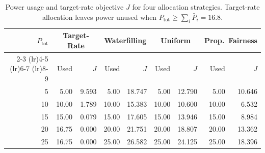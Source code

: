\begin{table}[t]
\centering
\caption{Power usage and target-rate objective $J$ for four allocation strategies. Target-rate allocation leaves power unused when $P_{\mathrm{tot}} \ge \sum_i \bar{P}_i = 16.8$.}
\label{tab:power_usage}
\begin{tabular}{rrrrrrrrr}
\toprule
$P_{\mathrm{tot}}$ & \multicolumn{2}{c}{Target-Rate} & \multicolumn{2}{c}{Waterfilling} & \multicolumn{2}{c}{Uniform} & \multicolumn{2}{c}{Prop.\ Fairness} \\
\cmidrule(lr){2-3} \cmidrule(lr){4-5} \cmidrule(lr){6-7} \cmidrule(lr){8-9}
 & Used & $J$ & Used & $J$ & Used & $J$ & Used & $J$ \\
\midrule
5 & 5.00 & 9.593 & 5.00 & 18.747 & 5.00 & 12.790 & 5.00 & 10.646 \\
10 & 10.00 & 1.789 & 10.00 & 15.383 & 10.00 & 10.600 & 10.00 & 6.532 \\
15 & 15.00 & 0.079 & 15.00 & 17.605 & 15.00 & 13.946 & 15.00 & 8.984 \\
20 & 16.75 & 0.000 & 20.00 & 21.751 & 20.00 & 18.807 & 20.00 & 13.362 \\
25 & 16.75 & 0.000 & 25.00 & 26.582 & 25.00 & 24.125 & 25.00 & 18.396 \\
\bottomrule
\end{tabular}
\end{table}

